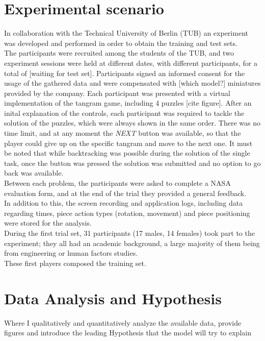 \documentclass[a4paper,singleside,12pt]{report} %
\begin{document}
    
	
	\chapter{Experimental scenario}
    In collaboration with the Technical University of Berlin (TUB) an experiment was developed and
    performed in order to obtain the training and test sets.\\
	The participants were recruited among the students of the TUB, and two experiment sessions were
	held at different dates, with different participants, for a total of [waiting for test set].
	Participants signed an informed consent for the usage of the gathered data and were compensated
	with [which model?] miniatures provided by the company. Each participant was presented with a
	virtual implementation of the tangram game, including 4 puzzles [cite figure]. After an inital
	explanation of the controls, each participant was required to tackle the solution of the
	puzzles, which were always shown in the same order. There was no time limit, and at any moment
	the \textit{NEXT} button was available, so that the player could give up on the specific tangram
	and move to the next one. It must be noted that while backtracking was possible during the
	solution of the single task, once the button was pressed the solution was submitted and no
	option to go back was available.\\
	Between each problem, the participants were asked to complete a NASA evaluation form, and at the
	end of the trial they provided a general feedback. \\
	In addition to this, the screen recording and application logs, including data regarding times,
	piece action types (rotation, movement) and piece positioning were stored for the analysis. \\
	During the first trial set, 31 participants (17 males, 14 females) took part to the experiment;
	they all had an academic background, a large majority of them being from engineering or human
	factors studies. \\
	These first players composed the training set.
    
	
	\chapter{Data Analysis and Hypothesis}
    Where I qualitatively and quantitatively analyze the available data, provide figures and
    introduce the leading Hypothesis that the model will try to explain
    
\end{document}
